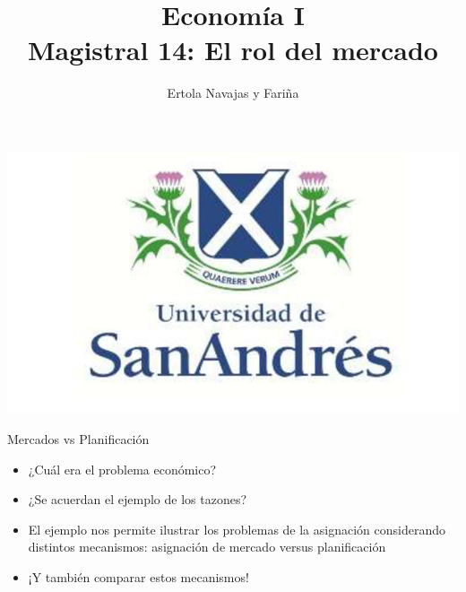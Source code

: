 \documentclass{beamer}
\title[Economía I]{Economía I \vspace{4mm}
\\ Magistral 14: El rol del mercado}
\date{}
\author[Ertola Navajas y Fariña]{Ertola Navajas y Fariña}
\institute[]{Universidad de San Andrés}
\begin{document}
\begin{frame}
\titlepage
\centering
\includegraphics[scale=0.2]{Slides Principios de Economia/Figures/logoUDESA.jpg} 
\end{frame}

\begin{frame}{Mercados vs Planificación}
    
    \begin{itemize}
        \item ¿Cuál era el problema económico?
        \item ¿Se acuerdan el ejemplo de los tazones? 
        \vspace{1mm}
        \item El ejemplo nos permite ilustrar los problemas de la asignación considerando distintos mecanismos: asignación de mercado versus planificación
        \vspace{1mm}
        \item ¡Y también comparar estos mecanismos! 
    \end{itemize}
\end{frame}
\end{document}
